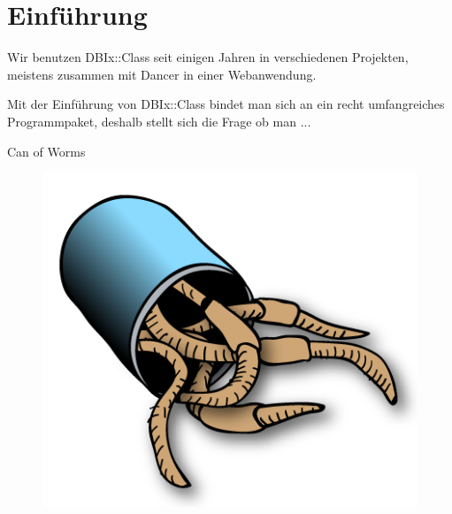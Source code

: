
\maketitle

\begin{frame}
  \titlepage
\end{frame}

\cleardoublepage

\tableofcontents

\cleardoublepage

\section{Einführung}

Wir benutzen DBIx::Class seit einigen Jahren in verschiedenen
Projekten, meistens zusammen mit Dancer in einer Webanwendung.

Mit der Einführung von DBIx::Class bindet man sich an ein
recht umfangreiches Programmpaket, deshalb stellt sich die
Frage ob man ...

\begin{frame}{Can of Worms}
\begin{figure}[!ht]
\centering
\includegraphics[width=0.75\linewidth]{img/canofworms.png}
\end{figure}
\end{frame}


